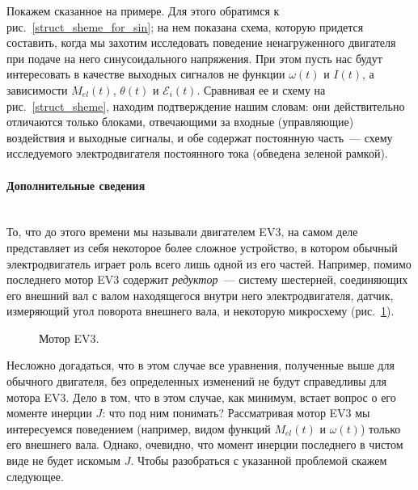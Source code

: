 \documentclass[12pt, a4paper, openany]{extarticle}
\begin{document}
Покажем сказанное на примере.
Для этого обратимся к рис.~\ref{struct_sheme_for_sin}; на нем показана схема, которую придется составить, когда мы захотим исследовать поведение ненагруженного двигателя при подаче на него синусоидального напряжения.
При этом пусть нас будут интересовать в качестве выходных сигналов не функции $\omega(t)$ и $I(t)$, а зависимости $M_{el}(t)$, $\theta(t)$ и $\mathcal E_i(t)$.
Сравнивая ее и схему на рис.~\ref{struct_sheme}, находим подтверждение нашим словам: они действительно отличаются только блоками, отвечающими за входные (управляющие) воздействия и выходные сигналы, и обе содержат постоянную часть~--- схему исследуемого электродвигателя постоянного тока (обведена зеленой рамкой).

\paragraph*{Дополнительные сведения}$\phantom{-}$\\
\hspace*{\parindent}То, что до этого времени мы называли двигателем EV3, на самом деле представляет из себя некоторое более сложное устройство, в котором обычный электродвигатель играет роль всего лишь одной из его частей.
Например, помимо последнего мотор EV3 содержит \textit{редуктор}~--- систему шестерней, соединяющих его внешний вал с валом находящегося внутри него электродвигателя, датчик, измеряющий угол поворота внешнего вала, и некоторую микросхему (рис.~\ref{motor_inside}).

\begin{figure}[h]
	\caption{Мотор EV3.}
	\label{motor_inside}
\end{figure}

Несложно догадаться, что в этом случае все уравнения, полученные выше для обычного двигателя, без определенных изменений не будут справедливы для мотора EV3.
Дело в том, что в этом случае, как минимум, встает вопрос о его моменте инерции $J$: что под ним понимать?
Рассматривая мотор EV3 мы интересуемся поведением (например, видом функций $M_{el}(t)$ и $\omega(t)$) только его внешнего вала.
Однако, очевидно, что момент инерции последнего в чистом виде не будет искомым $J$.
Чтобы разобраться с указанной проблемой скажем следующее.
\end{document}
